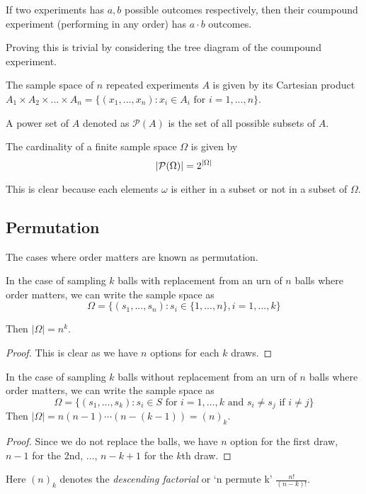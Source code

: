 \documentclass[11pt]{article}
\begin{document}
\begin{theorem}
  If two experiments has \(a,b\) possible outcomes respectively, then their coumpound experiment (performing in any order) has \(a\cdot b\) outcomes.
\end{theorem}
Proving this is trivial by considering the tree diagram of the coumpound experiment.

\begin{remark}
  The sample space of \(n\) repeated experiments \(A\) is given by its Cartesian product \(A_1 \times A_2 \times ... \times A_n = \{(x_1,...,x_n):x_i \in A_i \text{ for } i=1,...,n\}\).
\end{remark}

\begin{definition}
  A power set of \(A\) denoted as \(\mathcal{P}(A)\) is the set of all possible subsets of \(A\).
\end{definition}
\begin{theorem}
  The cardinality of a finite sample space \(\Omega\) is given by
  \[|\cal{P}(\Omega)|=2^{|\Omega|}\]
\end{theorem}
This is clear because each elements \(\omega\) is either in a subset or not in a subset of \(\Omega\).

\subsection{Permutation}
The cases where order matters are known as permutation.
\begin{theorem}
  In the case of sampling \(k\) balls with replacement from an urn of \(n\) balls where order matters, we can write the sample space as
  \begin{equation*}
    \Omega = \{(s_1,...,s_n):s_i\in \{1,...,n\}, i=1,...,k\}
  \end{equation*}
  
  Then \(|\Omega|=n^k\).
\end{theorem}
\begin{proof}
  This is clear as we have \(n\) options for each \(k\) draws.
\end{proof}

\begin{theorem}
  In the case of sampling \(k\) balls without replacement from an urn of \(n\) balls where order matters, we can write the sample space as
  \begin{equation*}
    \Omega=\{(s_1,...,s_k):s_i\in S \text{ for } i=1,...,k \text{ and } s_i\neq s_j \text{ if } i\neq j\}
  \end{equation*}
  Then \(|\Omega|=n(n-1)\cdots(n-(k-1)) = (n)_k\).
\end{theorem}
\begin{proof}
  Since we do not replace the balls, we have \(n\) option for the first draw, \(n-1\) for the 2nd, ..., \(n-k+1\) for the \(k\)th draw. 
\end{proof}
Here \((n)_k\) denotes the \emph{descending factorial} or `n permute k' \(\frac{n!}{(n-k)!}\).
\end{document}
